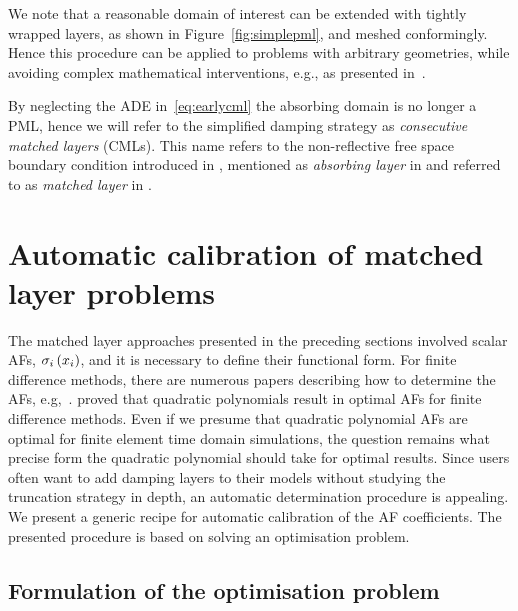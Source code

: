 \documentclass[a4paper]{article}
\begin{document}
We note that a reasonable domain of interest can be extended with
tightly wrapped layers, as shown in Figure~\ref{fig:simplepml}, and
meshed conformingly. Hence this procedure can be applied to problems
with arbitrary geometries, while avoiding complex mathematical
interventions, e.g., as presented in~\citep{gao08zhang}.

By neglecting the ADE in~\eqref{eq:earlycml} the absorbing domain is
no longer a PML, hence we will refer to the simplified damping
strategy as \emph{consecutive matched layers} (CMLs). This name refers
to the non-reflective free space boundary condition introduced in
\citet{katz76etall}, mentioned as \emph{absorbing layer} in
\citet{holland83williams} and referred to as \emph{matched layer} in
\citet{berenger94}.

\section{Automatic calibration of matched layer problems}
\label{sec:setup}

The matched layer approaches presented in the preceding sections
involved scalar AFs, $\sigma_{i}\del{x_{i}}$, and it is necessary to
define their functional form. For finite difference methods, there are
numerous papers describing how to determine the AFs,
e.g,~\citep{asvadurov03etall, chew96jin,
  collino98monk}. \citet{chew96jin} proved that quadratic polynomials
result in optimal AFs for finite difference methods. Even if we
presume that quadratic polynomial AFs are optimal for finite element
time domain simulations, the question remains what precise form the
quadratic polynomial should take for optimal results. Since users
often want to add damping layers to their models without studying the
truncation strategy in depth, an automatic determination procedure is
appealing. We present a generic recipe for automatic calibration of
the AF coefficients. The presented procedure is based on solving an
optimisation problem.

\subsection{Formulation of the optimisation problem}
\label{sec:opt}
\end{document}
